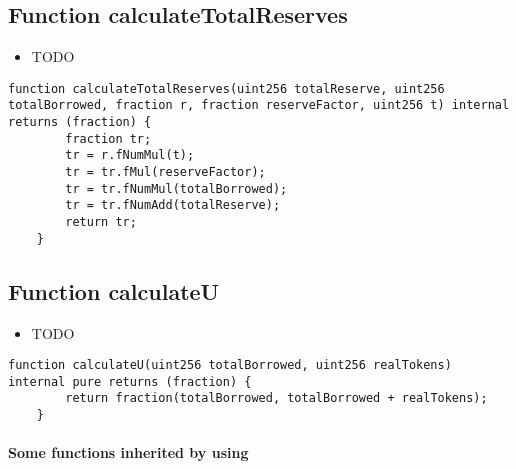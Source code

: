 \subsection{Function calculateTotalReserves}

\noindent\begin{itemize}
\item TODO
\end{itemize}

\begin{lstlisting}[firstnumber=28]
    function calculateTotalReserves(uint256 totalReserve, uint256 totalBorrowed, fraction r, fraction reserveFactor, uint256 t) internal returns (fraction) {
        fraction tr;
        tr = r.fNumMul(t);
        tr = tr.fMul(reserveFactor);
        tr = tr.fNumMul(totalBorrowed);
        tr = tr.fNumAdd(totalReserve);
        return tr;
    }
\end{lstlisting}

\subsection{Function calculateU}

\noindent\begin{itemize}
\item TODO
\end{itemize}

\begin{lstlisting}[firstnumber=9]
    function calculateU(uint256 totalBorrowed, uint256 realTokens) internal pure returns (fraction) {
        return fraction(totalBorrowed, totalBorrowed + realTokens);
    }
\end{lstlisting}
\paragraph{Some functions inherited by using}
